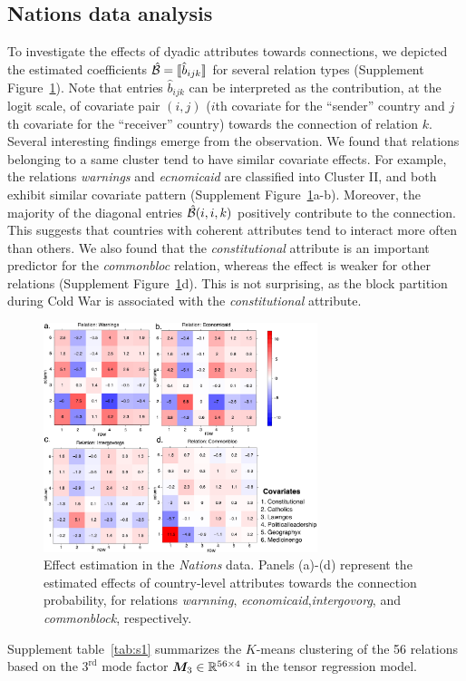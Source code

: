 \documentclass[11pt]{article}
\theoremstyle{plain}
\theoremstyle{definition}
\begin{document}
\subsection{Nations data analysis}
To investigate the effects of dyadic attributes towards connections, we depicted the estimated coefficients $\hat {\mathcal{B}}=\llbracket \hat b_{ijk} \rrbracket$ for several relation types (Supplement Figure~\ref{fig:est}). Note that entries $\hat b_{ijk}$ can be interpreted as the contribution, at the logit scale, of covariate pair $(i,j)$ ($i$th covariate for the ``sender'' country and $j$th covariate for the ``receiver'' country) towards the connection of relation $k$.  Several interesting findings emerge from the observation. We found that relations belonging to a same cluster tend to have similar covariate effects. For example, the relations \emph{warnings} and \emph{ecnomicaid} are classified into Cluster II, and both exhibit similar covariate pattern (Supplement Figure~\ref{fig:est}a-b). Moreover, the majority of the diagonal entries $\hat {\mathcal{B}}(i,i,k)$ positively contribute to the connection. This suggests that countries with coherent attributes tend to interact more often than others. We also found that the \emph{constitutional} attribute is an important predictor for the \emph{commonbloc} relation, whereas the effect is weaker for other relations (Supplement Figure~\ref{fig:est}d). This is not surprising, as the block partition during Cold War is associated with the \emph{constitutional} attribute. 

\begin{figure}[H]
\centering
\includegraphics[width=8cm]{coef.pdf}
\caption{Effect estimation in the \emph{Nations} data. Panels (a)-(d) represent the estimated effects of country-level attributes towards the connection probability, for relations \emph{warnning}, \emph{economicaid},\emph{intergovorg}, and \emph{commonblock}, respectively. }\label{fig:est}
\end{figure}
Supplement table~\ref{tab:s1} summarizes the $K$-means clustering of the 56 relations based on the $3^{\text{rd}}$ mode factor $\bm M_3\in\mathbb{R}^{56\times 4}$ in the tensor regression model. 
\end{document}
